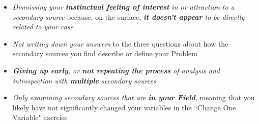 \documentclass[11pt]{article}
\begin{document}
\begin{itemize}
\begin{itemize}
\item \emph{Dismissing your \textbf{\emph{instinctual feeling of interest}} in or attraction to a secondary source} because, on the surface, \emph{\textbf{it doesn’t appear} to be directly related to your case}

\item \emph{Not writing down your answers} to the three questions about how the secondary sources you find describe or define your Problem

\item \emph{\textbf{Giving up early}, or \textbf{not repeating the process} of analysis and introspection with \textbf{multiple} secondary sources}

\item \emph{Only examining secondary sources that are \textbf{in your Field}}, meaning that you likely have not significantly changed your variables in the ``Change One Variable" exercise
\end{itemize}
\end{itemize}
\end{document}
